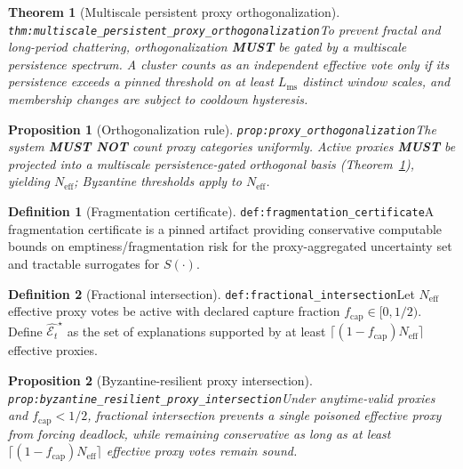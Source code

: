 \documentclass[11pt]{article}
\theoremstyle{definition}
\newtheorem{definition}{Definition}
\theoremstyle{plain}
\newtheorem{proposition}{Proposition}
\newtheorem{theorem}{Theorem}
\newcommand{\MUST}{\textbf{MUST}}
\newcommand{\MUSTNOT}{\textbf{MUST NOT}}
\newcommand{\lbl}[1]{\texttt{\footnotesize\nolinkurl{#1}}}
\newcommand{\DefLabel}[1]{\hfill{\small\lbl{#1}}}
\newcommand{\Et}{\mathcal{E}_t}
\newcommand{\fcap}{f_{\mathrm{cap}}}
\newcommand{\Neff}{N_{\mathrm{eff}}}
\newcommand{\Lms}{L_{\mathrm{ms}}}
\begin{document}
\begin{theorem}[Multiscale persistent proxy orthogonalization]\DefLabel{thm:multiscale_persistent_proxy_orthogonalization}\label{thm:multiscale_persistent_proxy_orthogonalization}
To prevent fractal and long-period chattering, orthogonalization \MUST{} be gated by a multiscale persistence spectrum.
A cluster counts as an independent effective vote only if its persistence exceeds a pinned threshold on at least $\Lms$ distinct window scales, and membership changes are subject to cooldown hysteresis.
\end{theorem}

\begin{proposition}[Orthogonalization rule]\DefLabel{prop:proxy_orthogonalization}\label{prop:proxy_orthogonalization}
The system \MUSTNOT{} count proxy categories uniformly.
Active proxies \MUST{} be projected into a multiscale persistence-gated orthogonal basis (Theorem~\ref{thm:multiscale_persistent_proxy_orthogonalization}), yielding $\Neff$; Byzantine thresholds apply to $\Neff$.
\end{proposition}

\begin{definition}[Fragmentation certificate]\DefLabel{def:fragmentation_certificate}\label{def:fragmentation_certificate}
A fragmentation certificate is a pinned artifact providing conservative computable bounds on emptiness/fragmentation risk for the proxy-aggregated uncertainty set and tractable surrogates for $S(\cdot)$.
\end{definition}

\begin{definition}[Fractional intersection]\DefLabel{def:fractional_intersection}\label{def:fractional_intersection}
Let $\Neff$ effective proxy votes be active with declared capture fraction $\fcap\in[0,1/2)$.
Define $\widehat{\Et}^{\star}$ as the set of explanations supported by at least $\lceil (1-\fcap)\Neff\rceil$ effective proxies.
\end{definition}

\begin{proposition}[Byzantine-resilient proxy intersection]\DefLabel{prop:byzantine_resilient_proxy_intersection}\label{prop:byzantine_resilient_proxy_intersection}
Under anytime-valid proxies and $\fcap<1/2$, fractional intersection prevents a single poisoned effective proxy from forcing deadlock, while remaining conservative as long as at least $\lceil (1-\fcap)\Neff\rceil$ effective proxy votes remain sound.
\end{proposition}
\end{document}
